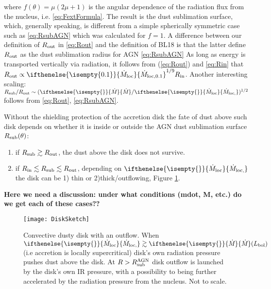 \documentclass[12pt,english,preprint]{aastex}
\newcommand{\su}[2]{#1_{\rm #2}}
\newcommand{\mdt}[1][]{ 
  \ifthenelse{\isempty{#1}}
  {\dot{M}_{\rm loc}}
  { {\dot M}_{\rm{loc},{#1}} } 
  } %
\newcommand{\Mdt}[1][]{ 
    \ifthenelse{\isempty{#1}}
    {\dot{M}_{}}
    { {\dot M}_{{#1}} } 
} %
\newcommand{\Rout}{\su{R}{out}}
\newcommand{\Rin}{\su{R}{in}}
\newcommand{\rsub}{ \su{R}{sub} }
\begin{document}
\noindent where $f(\theta)=\mu(2\mu+1)$ is the angular dependence of the radiation flux from the nucleus, i.e. \eqref{eq:FextFormula}. 
The result is the dust sublimation surface, which, generally speaking, is different from a simple spherically symmetric case such as 
\eqref{eq:RsubAGN} which was calculated for $f=1$. 
A difference between our definition of $\su{R}{out}$
in \eqref{eq:Rout} and the definition of BL18 is that the latter
define $\su{R}{out}$ as the dust sublimation radius for AGN 
\eqref{eq:RsubAGN}
As long as energy is transported vertically via radiation, it follows
from (\ref{eq:Rout}) and \eqref{eq:Rin} that $\Rout\propto\mdt[0.1]^{1/9}\Rin$.
Another interesting scaling: $\su{R}{sub}/R_{{\rm out}}\sim (\Mdt/\mdt)^{1/2}$ 
follows from \eqref{eq:Rout}, \eqref{eq:RsubAGN}.

Without the shielding protection of the accretion disk the fate of
dust above such disk depends on whether it is inside or outside the
AGN dust sublimation surface $\rsub(\theta)$:

\begin{enumerate}
  \item if $\rsub \gtrsim \su{R}{out}$, the dust above the disk does not survive.
  \item if $\su{R}{in} \lesssim \rsub \lesssim \su{R}{out}$, depending on $\mdt$ the disk can 
  be 1) thin or 2)thick/outflowing, 
  Figure \ref{fig:DiskSketch}.  
\end{enumerate}

{\bf Here we need a discussion:  under what conditions 
(mdot, M, etc.) do we get each of these cases??}



\begin{figure}
  \texttt{[image: DiskSketch]} 
  \caption{\label{fig:DiskSketch} 
  Convective dusty disk with an outflow.
  When $\mdt\gtrsim \Mdt  (L_{{\rm bol}})$ (i.e accretion is locally supercritical)
  disk's own radiation pressure pushes dust above the disk. 
  At  $R>\su{R}{sub}^{\rm AGN}$ disk outflow is launched by the disk's 
  own IR pressure, with a possibility to being further accelerated by the radiation
  pressure from the nucleus.
  Not to scale.}
  \end{figure}
  
\end{document}
